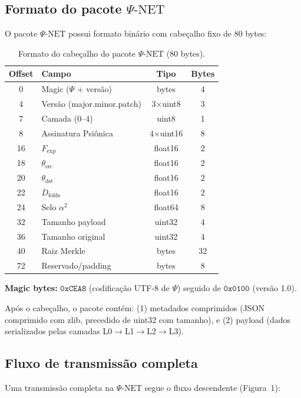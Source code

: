 \documentclass[12pt,a4paper]{article}
\newcommand{\alphaii}{\alpha^2}
\newcommand{\Dfolds}{D_{\text{folds}}}
\newcommand{\Fexp}{F_{\text{exp}}}
\newcommand{\PsiNet}{\Psi\text{-NET}}
\begin{document}
\subsection{Formato do pacote $\PsiNet$}

O pacote $\PsiNet$ possui formato binário com cabeçalho fixo de
80 bytes:

\begin{table}[H]
\centering
\caption{Formato do cabeçalho do pacote $\PsiNet$ (80 bytes).}
\label{tab:header}
\begin{tabular}{clcc}
\toprule
\textbf{Offset} & \textbf{Campo} & \textbf{Tipo} &
  \textbf{Bytes} \\
\midrule
0 & Magic ($\Psi$ + versão) & bytes & 4 \\
4 & Versão (major.minor.patch) & 3$\times$uint8 & 3 \\
7 & Camada (0--4) & uint8 & 1 \\
8 & Assinatura Psiônica & 4$\times$uint16 & 8 \\
16 & $\Fexp$ & float16 & 2 \\
18 & $\theta_{\text{src}}$ & float16 & 2 \\
20 & $\theta_{\text{dst}}$ & float16 & 2 \\
22 & $\Dfolds$ & float16 & 2 \\
24 & Selo $\alphaii$ & float64 & 8 \\
32 & Tamanho payload & uint32 & 4 \\
36 & Tamanho original & uint32 & 4 \\
40 & Raiz Merkle & bytes & 32 \\
72 & Reservado/padding & bytes & 8 \\
\bottomrule
\end{tabular}
\end{table}

\textbf{Magic bytes:} $\texttt{0xCEA8}$ (codificação UTF-8 de
$\Psi$) seguido de $\texttt{0x0100}$ (versão 1.0).

Após o cabeçalho, o pacote contém: (1) metadados comprimidos
(JSON comprimido com zlib, precedido de uint32 com tamanho),
e (2) payload (dados serializados pelas camadas
L0$\to$L1$\to$L2$\to$L3).

\subsection{Fluxo de transmissão completa}

Uma transmissão completa na $\PsiNet$ segue o fluxo descendente
(Figura~1):
\end{document}
